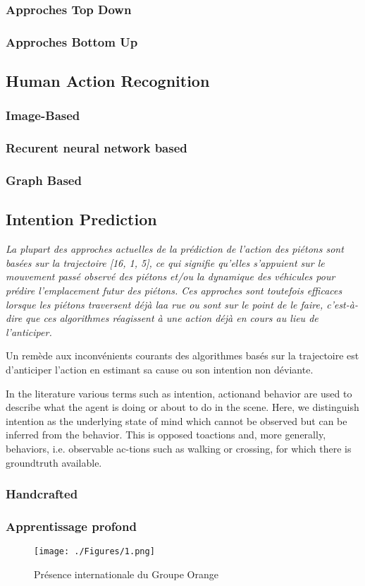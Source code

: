 \label{subsec:SQUEL}
\subsubsection{Approches Top Down}
\subsubsection{Approches Bottom Up}

\subsection{Human Action Recognition}
\label{subsec:HAR}

\subsubsection{Image-Based}
\subsubsection{Recurent neural network based}
\subsubsection{Graph Based}

\subsection{Intention Prediction}
\textit{La plupart des approches actuelles de la prédiction de l'action des piétons sont basées sur la trajectoire [16, 1, 5], ce qui signifie qu'elles s'appuient sur le mouvement passé observé des piétons et/ou la dynamique des véhicules pour prédire l'emplacement futur des piétons. Ces approches sont toutefois efficaces lorsque les piétons traversent déjà laa rue ou sont sur le point de le faire, c'est-à-dire que ces algorithmes réagissent à une action déjà en cours au lieu de l'anticiper.}

Un remède aux inconvénients courants des algorithmes basés sur la trajectoire est d'anticiper l'action en estimant sa cause ou son intention non déviante.


In the literature various terms such as intention, actionand behavior are used to describe what the agent is doing or about to do in the scene. Here, we distinguish intention as the underlying state of mind which cannot be observed but can be inferred from the behavior. This is opposed toactions and, more generally, behaviors, i.e. observable ac-tions such as walking or crossing, for which there is groundtruth available.




\subsubsection{Handcrafted}
\subsubsection{Apprentissage profond}





\begin{figure}[htbp]
    \texttt{[image: ./Figures/1.png]}
    \caption{Présence internationale du Groupe Orange}
    \label{fig:UoC}
\end{figure}

